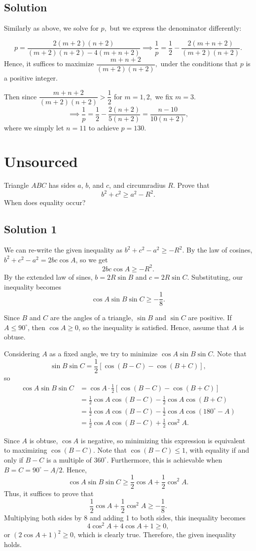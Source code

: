 \documentclass{article}
\begin{document}
\subsection{Solution}
Similarly as above, we solve for $p,$ but we express the denominator differently:

\[p=\dfrac{2(m+2)(n+2)}{(m+2)(n+2)-4(m+n+2)} \implies \dfrac{1}{p}=\dfrac{1}{2}-\dfrac{2(m+n+2)}{(m+2)(n+2)}.\]Hence, it suffices to maximize $\dfrac{m+n+2}{(m+2)(n+2)},$ under the conditions that $p$ is a positive integer.

Then since $\dfrac{m+n+2}{(m+2)(n+2)}>\dfrac{1}{2}$ for $m=1,2,$ we fix $m=3.$\[\implies \dfrac{1}{p}=\dfrac{1}{2}-\dfrac{2(n+2)}{5(n+2)}=\dfrac{n-10}{10(n+2)},\]where we simply let $n=11$ to achieve $p=\boxed{130}.$
\pagebreak\section{Unsourced}
Triangle $ABC$ has sides $a$, $b$, and $c$, and circumradius $R$. Prove that
\[b^2 + c^2 \ge a^2 - R^2.\]
When does equality occur?
\subsection{Solution 1}
We can re-write the given inequality as $b^2 + c^2 - a^2 \ge -R^2$. By the law of cosines, $b^2 + c^2 - a^2 = 2bc \cos A$, so we get
\[2bc \cos A \ge -R^2.\]
By the extended law of sines, $b = 2R \sin B$ and $c = 2R \sin C$. Substituting, our inequality becomes
\[\cos A \sin B \sin C \ge -\frac{1}{8}.\]

Since $B$ and $C$ are the angles of a triangle, $\sin B$ and $\sin C$ are positive. If $A \le 90^\circ$, then $\cos A \ge 0$, so the inequality is satisfied. Hence, assume that $A$ is obtuse.

Considering $A$ as a fixed angle, we try to minimize $\cos A \sin B \sin C$. Note that
\[\sin B \sin C = \frac{1}{2} [\cos (B - C) - \cos (B + C)],\]
so
\begin{align*}
\cos A \sin B \sin C &= \cos A \cdot \frac{1}{2} [\cos (B - C) - \cos (B + C)] \\
&= \frac{1}{2} \cos A \cos (B - C) - \frac{1}{2} \cos A \cos (B + C) \\
&= \frac{1}{2} \cos A \cos (B - C) - \frac{1}{2} \cos A \cos (180^\circ - A) \\
&= \frac{1}{2} \cos A \cos (B - C) + \frac{1}{2} \cos^2 A.
\end{align*}

Since $A$ is obtuse, $\cos A$ is negative, so minimizing this expression is equivalent to maximizing $\cos (B - C)$. Note that $\cos (B - C) \le 1$, with equality if and only if $B - C$ is a multiple of $360^\circ$. Furthermore, this is achievable when $B = C = 90^\circ - A/2$. Hence,
\[\cos A \sin B \sin C \ge \frac{1}{2} \cos A + \frac{1}{2} \cos^2 A.\]
Thus, it suffices to prove that
\[\frac{1}{2} \cos A + \frac{1}{2} \cos^2 A \ge -\frac{1}{8}.\]
Multiplying both sides by 8 and adding 1 to both sides, this inequality becomes
\[4 \cos^2 A + 4 \cos A + 1 \ge 0,\]
or $(2 \cos A + 1)^2 \ge 0$, which is clearly true. Therefore, the given inequality holds.
\end{document}
